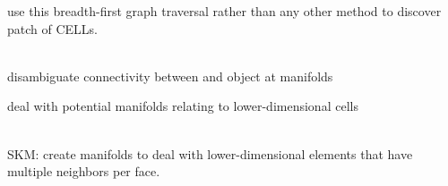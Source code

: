 \begin{DoxyRefList}
use this breadth-\/first graph traversal rather than any other method to discover patch of CELLs.  
\item[Member \doxylink{classcsmp_1_1_mesh_manager_a9e6fb9d0790af9b9cedffcb44aa30617}{csmp\+::Mesh\+Manager\texorpdfstring{$<$}{<} dim \texorpdfstring{$>$}{>}\+::Build\+Connectivity} (typename std\+::vector\texorpdfstring{$<$}{<} CELL$<$ dim $>$ \texorpdfstring{$\ast$}{*} \texorpdfstring{$>$}{>}\doxylink{structcsmp_1_1_inter_face_parent_elements}{const\+\_\+iterator} first, typename std\+::vector\texorpdfstring{$<$}{<} CELL$<$ dim $>$ \texorpdfstring{$\ast$}{*} \texorpdfstring{$>$}{>}\doxylink{structcsmp_1_1_inter_face_parent_elements}{const\+\_\+iterator} last)]\hfill \\
\label{todo__todo000013}%
%
disambiguate connectivity between  and  object at manifolds 

\label{todo__todo000162}%
%
deal with potential manifolds relating to lower-\/dimensional cells 
\item[Member \doxylink{classcsmp_1_1_mesh_manager_aa74e97e862d1edde85bdc6d39dbe9489}{csmp\+::Mesh\+Manager\texorpdfstring{$<$}{<} dim \texorpdfstring{$>$}{>}\+::Initialize} (const \doxylink{classcsmp_1_1_property_database}{Property\+Database$<$ dim $>$} \&, const \doxylink{classcsmp_1_1_v_set}{VSet$<$ dim $>$} \&, bool initialise\+\_\+\+FV\+\_\+stencils)]\hfill \\
\label{todo__todo000161}%
%
SKM\+: create manifolds to deal with lower-\/dimensional elements that have multiple neighbors per face. 
\item[Class \doxylink{classcsmp_1_1_mesh_manager___test}{csmp\+::Mesh\+Manager\+\_\+\+Test} ]\hfill \\
\label{todo__todo000248}%
%




\end{DoxyRefList}
